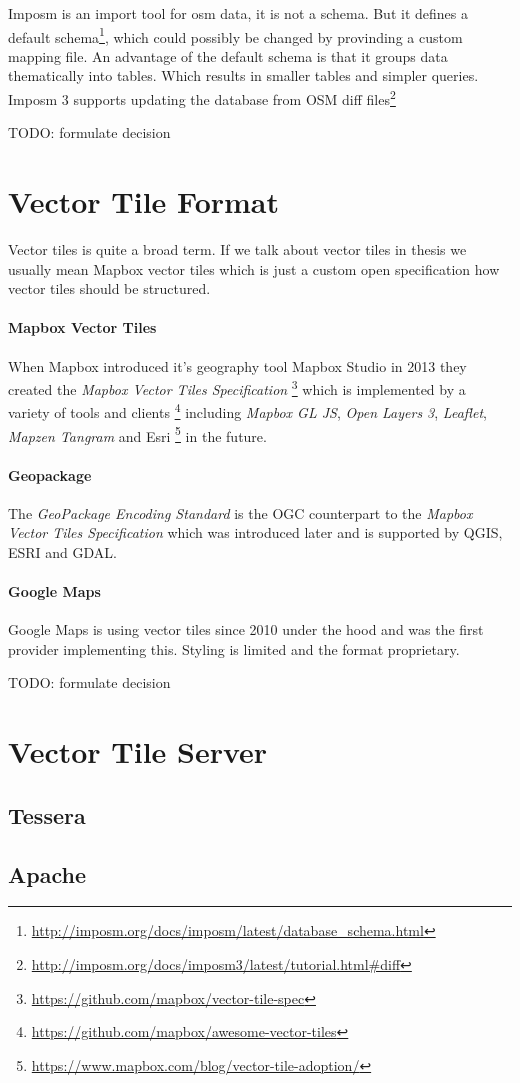 Imposm is an import tool for osm data, it is not a schema. But it
defines a default
schema\footnote{\url{http://imposm.org/docs/imposm/latest/database_schema.html}},
which could possibly be changed by provinding a custom mapping file. An
advantage of the default schema is that it groups data thematically into
tables. Which results in smaller tables and simpler queries. Imposm 3
supports updating the database from OSM diff
files\footnote{\url{http://imposm.org/docs/imposm3/latest/tutorial.html\#diff}}

TODO: formulate decision

\section{Vector Tile Format}\label{vector-tile-formats}

Vector tiles is quite a broad term. If we talk about vector tiles in thesis we usually mean Mapbox vector tiles which is just a custom open specification how vector tiles should be structured.

\paragraph{Mapbox Vector Tiles}

When Mapbox introduced it's geography tool Mapbox Studio in 2013 they
created the \emph{Mapbox Vector Tiles Specification}
\footnote{\url{https://github.com/mapbox/vector-tile-spec}} which is
implemented by a variety of tools and clients
\footnote{\url{https://github.com/mapbox/awesome-vector-tiles}}
including \emph{Mapbox GL JS}, \emph{Open Layers 3}, \emph{Leaflet},
\emph{Mapzen Tangram} and Esri
\footnote{\url{https://www.mapbox.com/blog/vector-tile-adoption/}} in
the future.

\paragraph{Geopackage}

The \emph{GeoPackage Encoding Standard} is the OGC counterpart to the
\emph{Mapbox Vector Tiles Specification} which was introduced later and
is supported by QGIS, ESRI and GDAL.

\paragraph{Google Maps}

Google Maps is using vector tiles since 2010 under the hood and was the
first provider implementing this. Styling is limited and the format
proprietary.

TODO: formulate decision

\section{Vector Tile Server}

\subsection{Tessera}

\subsection{Apache}